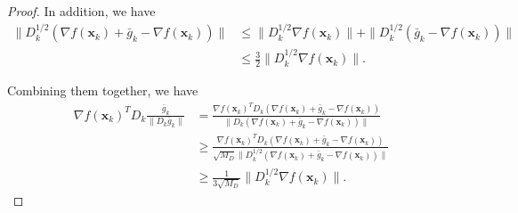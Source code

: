 \documentclass{article}
\newcommand{\bx}{\boldsymbol{x}}
\newcommand{\barg}{\bar{g}}
\theoremstyle{plain}
\theoremstyle{definition}
\theoremstyle{remark}
\begin{document}
\begin{proof}
In addition, we have
\begin{align*}
    \|D_k^{1/2}(\nabla f(\bx_k) + \barg_k - \nabla f(\bx_k))\| 
    & \leq \|D_k^{1/2}\nabla f(\bx_k)\| + \| D_k^{1/2}(\barg_k - \nabla f(\bx_k))\| \\
    & \leq \frac{3}{2}\|D_k^{1/2}\nabla f(\bx_k)\|.
\end{align*}

Combining them together, we have
\begin{align*}
    \nabla f(\bx_k)^TD_k\frac{\barg_k}{\|D_k\barg_k\|} & = \frac{\nabla f(\bx_k)^TD_k(\nabla f(\bx_k)+\barg_k-\nabla f(\bx_k))}{\|D_k(\nabla f(\bx_k)+\barg_k-\nabla f(\bx_k))\|}\\
    & \geq \frac{\nabla f(\bx_k)^TD_k(\nabla f(\bx_k)+\barg_k-\nabla f(\bx_k))}{\sqrt{M_D}\|D_k^{1/2}(\nabla f(\bx_k)+\barg_k-\nabla f(\bx_k))\|}\\
    & \geq \frac{1}{3\sqrt{M_D}}\|D_k^{1/2}\nabla f(\bx_k)\|.
\end{align*}



\end{proof}
\end{document}
